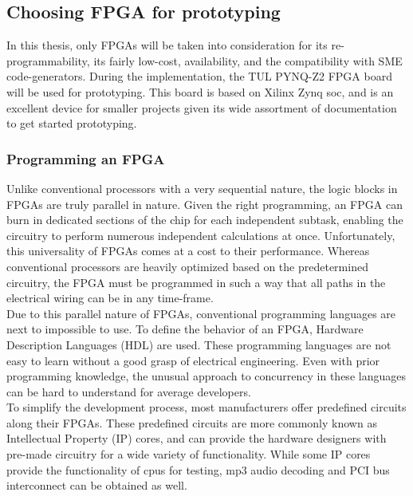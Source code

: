 \subsection{Choosing FPGA for prototyping}
In this thesis, only FPGAs will be taken into consideration for
its re-programmability, its fairly low-cost, availability, and the
compatibility with SME code-generators. During the implementation, the
TUL PYNQ\texttrademark-Z2 FPGA board will be used for prototyping. This
board is based on Xilinx Zynq \gls{soc}, and is an excellent device
for smaller projects given its wide assortment of documentation to get
started prototyping.\cite{tul_pynq}





\subsubsection{Programming an FPGA}
Unlike conventional processors with a very sequential nature, the logic blocks
in FPGAs are truly parallel in nature. Given the right programming, an FPGA can
burn in
dedicated sections of the chip for each independent subtask, enabling
the circuitry to perform numerous independent calculations at once\cite{ni_fpga}.
Unfortunately, this universality of FPGAs comes at a cost to their performance.
Whereas conventional processors are heavily optimized based on the predetermined
circuitry,
the FPGA must
be programmed in such a way that all paths in the electrical wiring can be
in any time-frame.
\\
Due to this parallel nature of FPGAs, conventional programming languages are
next to impossible to use. To define the behavior of an FPGA, Hardware
Description Languages (HDL) are used. These programming languages are not easy
to learn without a good grasp of electrical engineering. Even with prior
programming knowledge, the unusual approach to concurrency in these languages
can be hard to understand for average developers.\\
To simplify the development process, most manufacturers offer predefined
circuits along their FPGAs. These predefined circuits are more commonly known
as Intellectual Property (IP) cores, and can provide the hardware designers
with pre-made circuitry for a wide variety of functionality. While some IP
cores provide the functionality of \gls{cpu}s for
testing\cite{intel_ip_core_80186EC}, mp3 audio decoding and PCI bus
interconnect can be obtained as well\cite{fpga_for_dummies}.



